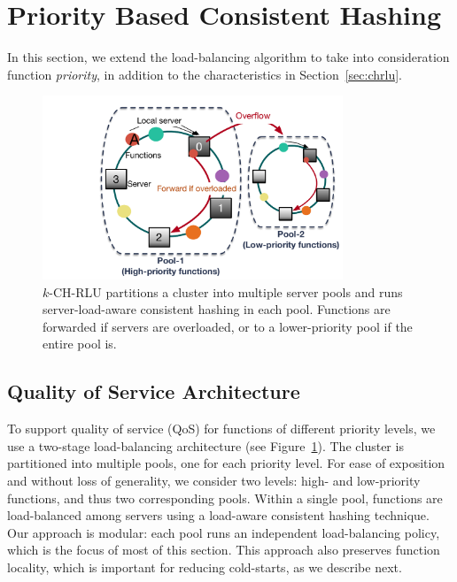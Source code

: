\section{Priority Based Consistent Hashing} %
\label{sec:qos-chrlu}

In this section, we extend the load-balancing algorithm to take into consideration function \emph{priority}, in addition to the characteristics in Section~\ref{sec:chrlu}. 

\begin{figure}
\centering
  \includegraphics[width=0.8\textwidth]{chrlu/qos/figs/k-rlu2.pdf}
  \caption{$k$-CH-RLU partitions a cluster into multiple server pools and runs server-load-aware consistent hashing in each pool. Functions are forwarded if servers are overloaded, or to a lower-priority pool if the entire pool is.}
  \label{fig:2-pool-arch}
\end{figure}

\subsection{Quality of Service Architecture}

To support quality of service (QoS) for functions of different priority levels, we use a two-stage load-balancing architecture (see Figure~\ref{fig:2-pool-arch}). 
The cluster is partitioned into multiple pools, one for each priority level.
For ease of exposition and without loss of generality, we consider two levels: high- and low-priority functions, and thus two corresponding pools. 
Within a single pool, functions are load-balanced among servers using a load-aware consistent hashing technique. 
Our approach is modular: each pool runs an independent load-balancing policy, which is the focus of most of this section. 
This approach also preserves function locality, which is important for reducing cold-starts, as we describe next.  

